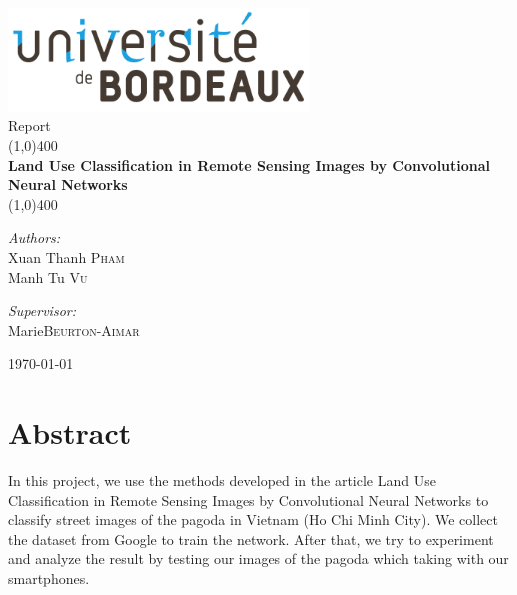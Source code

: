 \documentclass[12pt,a4paper]{article}
\begin{document}
\begin{titlepage}
	\begin{center}
\includegraphics[width=0.6\textwidth]{images/bordeaux.png}\\[1cm]


{\large Report}\\[0.5cm]	
	
	\line(1,0){400}\\[0.2in]
	\huge{\bfseries Land Use Classification in Remote Sensing Images by Convolutional Neural Networks}\\
	\line(1,0){400}\\[1.5cm]
	
	\noindent	
	
	\begin{minipage}[t]{0.4\textwidth}
		\begin{flushleft} \large
    	\emph{Authors:}\\
    	Xuan Thanh \textsc{Pham}\\
    	Manh Tu \textsc{Vu}
		\end{flushleft}
	\end{minipage}
	\begin{minipage}[t]{0.4\textwidth}
  		\begin{flushright} \large
    		\emph{Supervisor:} \\
    		Marie\textsc{Beurton-Aimar}
  		\end{flushright}
	\end{minipage}
	
	\vfill

{\large \today}
	\end{center}
\end{titlepage}


\tableofcontents
\thispagestyle{empty}
\clearpage


\section*{Abstract}
In this project, we use the methods developed in the
article Land Use Classification in Remote Sensing Images
by Convolutional Neural Networks \cite{castelluccio2015land} to classify street images of the pagoda in Vietnam (Ho Chi Minh City). We collect the dataset from Google to train the network. After that, we try to experiment and analyze the result by testing our images of the pagoda which taking with our smartphones.
\end{document}
